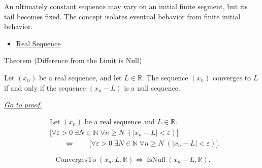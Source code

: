 \begin{remark*}[Interpretation]
An ultimately constant sequence may vary on an initial finite segment, but its
tail becomes fixed. The concept isolates eventual behavior from finite
initial behavior.
\end{remark*}

\begin{dependencies}
\begin{itemize}
  \item \hyperref[def:real-sequence]{Real Sequence}
\end{itemize}
\end{dependencies}


\begin{theorembox}{Theorem (Difference from the Limit is Null)}
\begin{theorem}
\label{thm:difference-from-limit-is-null}
Let $(x_n)$ be a real sequence, and let $L \in \mathbb{R}$. The sequence
$(x_n)$ converges to $L$ if and only if the sequence $(x_n - L)$ is a null
sequence.

\smallskip
\noindent
\hyperref[prf:difference-from-limit-is-null]{\textit{Go to proof.}}
\end{theorem}
\end{theorembox}

\begin{remark*}
\[
\begin{aligned}
&\text{Let } (x_n) \text{ be a real sequence and } L \in \mathbb{R}.\\
&\bigl[
\forall \varepsilon > 0\;
\exists N \in \mathbb{N}\;
\forall n \ge N\;(|x_n - L| < \varepsilon)
\bigr]\\
&\qquad\Longleftrightarrow\qquad
\bigl[
\forall \varepsilon > 0\;
\exists N \in \mathbb{N}\;
\forall n \ge N\;(|x_n - L| < \varepsilon)
\bigr].
\end{aligned}
\]
\end{remark*}

\begin{remark*}
\[
\operatorname{ConvergesTo}(x_n,L,\mathbb{R})
\Longleftrightarrow
\operatorname{IsNull}(x_n - L,\mathbb{R}).
\]
\end{remark*}

